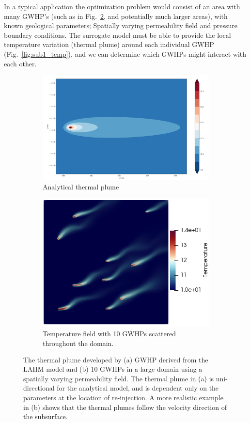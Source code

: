 \documentclass{article} %
\begin{document}
In a typical application the optimization problem would consist of an area with many GWHP's (such as in Fig.~\ref{large_example}, and potentially much larger areas), with known geological parameters; Spatially varying permeability field and pressure boundary conditions. 
The surrogate model must be able to provide the local temperature variation (thermal plume) around each individual GWHP (Fig.~\ref{fig:sub1_temp}), and we can determine which GWHPs might interact with each other.

\begin{figure}[!htb]
\centering
\begin{subfigure}{.5\textwidth}
  \centering
  \includegraphics[width=.8\linewidth]{analyticalPlume.png}
  \caption{Analytical thermal plume}
  \label{analyticalPlume}
\end{subfigure}%
\begin{subfigure}{.5\textwidth}
  \centering
  \includegraphics[width=.8\linewidth]{large_temp_example_2.png}
  \caption{Temperature field with 10 GWHPs scattered throughout the domain.}
  \label{large_example}
\end{subfigure}
\caption{The thermal plume developed by (a) GWHP derived from the LAHM model \citep{Pophillat2020} and (b) 10 GWHPs in a large domain using a spatially varying permeability field. The thermal plume in (a) is uni-directional for the analytical model, and is dependent only on the parameters at the location of re-injection. A more realistic example in (b) shows that the thermal plumes follow the velocity direction of the subsurface.}
\label{fig:plume_and_overview}
\end{figure}
\end{document}
